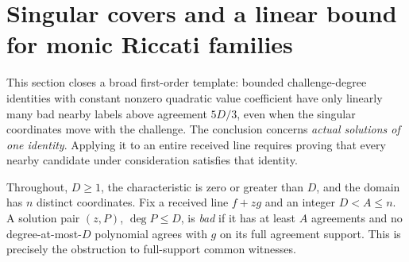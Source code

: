\section{Singular covers and a linear bound for monic Riccati families}
\label{app:singular-cover-riccati}

This section closes a broad first-order template: bounded challenge-degree
identities with constant nonzero quadratic value coefficient have only
linearly many bad nearby labels above agreement $5D/3$, even when the
singular coordinates move with the challenge. The conclusion concerns
\emph{actual solutions of one identity}. Applying it to an entire received
line requires proving that every nearby candidate under consideration
satisfies that identity.

Throughout, $D\ge1$, the characteristic is zero or greater than $D$,
and the domain has $n$ distinct coordinates. Fix a received line $f+zg$
and an integer $D<A\le n$. A solution pair $(z,P)$, $\deg P\le D$, is
\emph{bad} if it has at least $A$ agreements and no degree-at-most-$D$
polynomial agrees with $g$ on its full agreement support. This is precisely
the obstruction to full-support common witnesses.

